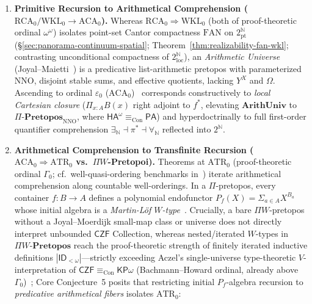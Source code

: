 \documentclass[10pt,twoside,openright]{book}
\theoremstyle{crmplain}
\theoremstyle{crmdef}
\theoremstyle{crmremark}
\begin{document}
\begin{enumerate}[label=\textbf{\arabic*.},leftmargin=1.8em]

  \item \textbf{Primitive Recursion to Arithmetical Comprehension ($\mathrm{RCA}_0 / \mathrm{WKL}_0 \to \mathrm{ACA}_0$).} Whereas $\mathrm{RCA}_0 \Rightarrow \mathrm{WKL}_0$ (both of proof-theoretic ordinal $\omega^\omega$) isolates point-set Cantor compactness $\mathrm{FAN}$ on $2^{\mathbb{N}}_{\mathrm{pt}}$ (\S\ref{sec:panorama-continuum-spatial}; Theorem~\ref{thm:realizability-fan-wkl}; contrasting unconditional compactness of $2^{\mathbb{N}}_{\mathrm{loc}}$), an \emph{Arithmetic Universe} (Joyal--Maietti~\cite{Maietti05}) is a predicative list-arithmetic pretopos with parameterized $\mathrm{NNO}$, disjoint stable sums, and effective quotients, lacking $Y^X$ and $\Omega$. Ascending to ordinal $\varepsilon_0$ ($\mathrm{ACA}_0$)~\cite{Friedman75,Simpson09} corresponds constructively to \emph{local Cartesian closure} ($\Pi_{x:A} B(x)$ right adjoint to $f^*$, elevating $\mathbf{ArithUniv}$ to $\Pi\text{-}\mathbf{Pretopos}_{\mathrm{NNO}}$, where $\mathsf{HA}^\omega \equiv_{\mathrm{Con}} \mathsf{PA}$) and hyperdoctrinally to full first-order quantifier comprehension $\exists_{\mathbb{N}} \dashv \pi^* \dashv \forall_{\mathbb{N}}$ reflected into $2^{\mathbb{N}}$.

  \item \textbf{Arithmetical Comprehension to Transfinite Recursion ($\mathrm{ACA}_0 \Rightarrow \mathrm{ATR}_0$ vs.\ $\Pi W$-Pretopoi).} Theorems at $\mathrm{ATR}_0$ (proof-theoretic ordinal $\Gamma_0$; cf.\ well-quasi-ordering benchmarks in~\cite{Friedman75,Simpson09}) iterate arithmetical comprehension along countable well-orderings. In a $\Pi$-pretopos, every container $f: B \to A$ defines a polynomial endofunctor $P_f(X) = \Sigma_{a \in A} X^{B_a}$ whose initial algebra is a \emph{Martin-L\"of $W$-type}~\cite{Maietti05}. Crucially, a bare $\Pi W$-pretopos without a Joyal--Moerdijk small-map class or universe does not directly interpret unbounded $\mathsf{CZF}$ Collection, whereas nested/iterated $W$-types in $\Pi W\text{-}\mathbf{Pretopos}$ reach the proof-theoretic strength of finitely iterated inductive definitions $|\mathsf{ID}_{<\omega}|$---strictly exceeding Aczel's single-universe type-theoretic $V$-interpretation of $\mathsf{CZF} \equiv_{\mathrm{Con}} \mathsf{KP}\omega$ (Bachmann--Howard ordinal, already above $\Gamma_0$)~\cite{Aczel78}; Core Conjecture~5 posits that restricting initial $P_f$-algebra recursion to \emph{predicative arithmetical fibers} isolates $\mathrm{ATR}_0$:


\end{enumerate}
\end{document}
